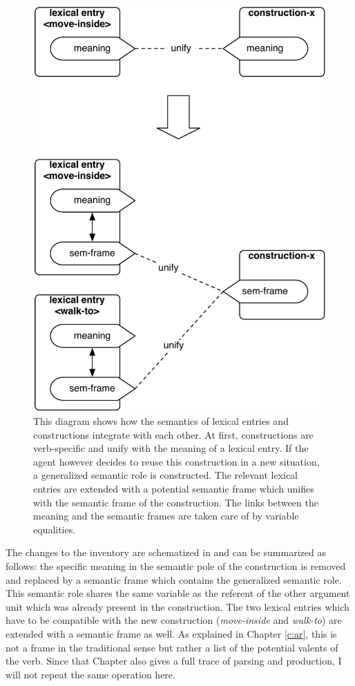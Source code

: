 \begin{figure}[htp]
\centerline{\includegraphics[width=0.7\linewidth]{Chapter3/figs/generalise}}
  \caption[Constructing generalized semantic roles]{This diagram shows how the semantics of lexical entries and constructions integrate with each other. At first, constructions are verb-specific and unify with the meaning of a lexical entry. If the agent however decides to reuse this construction in a new situation, a generalized semantic role is constructed. The relevant lexical entries are extended with a potential semantic frame which unifies with the semantic frame of the construction. The links between the meaning and the semantic frames are taken care of by variable equalities.}
   \label{f:generalise}
\end{figure}

The changes to the inventory are schematized in  and can be summarized as follows: the specific meaning in the semantic pole of the construction is removed and replaced by a semantic frame which contains the generalized semantic role. This semantic role shares the same variable as the referent of the other argument unit which was already present in the construction. The two lexical entries which have to be compatible with the new construction ({\em move-inside} and {\em walk-to}) are extended with a semantic frame as well. As explained in Chapter \ref{c:ar}, this is not a frame in the traditional sense but rather a list of the potential valents of the verb. Since that Chapter also gives a full trace of parsing and production, I will not repeat the same operation here.


